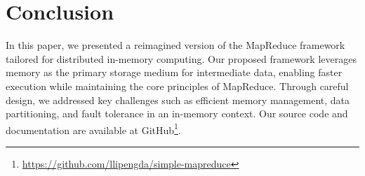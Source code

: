 \section{Conclusion}
\label{sec:conclusion}
In this paper, we presented a reimagined version of the MapReduce framework tailored for distributed in-memory computing. Our proposed framework leverages memory as the primary storage medium for intermediate data, enabling faster execution while maintaining the core principles of MapReduce. Through careful design, we addressed key challenges such as efficient memory management, data partitioning,
 and fault tolerance in an in-memory context. Our source code and documentation are available at GitHub\footnote{\url{https://github.com/llipengda/simple-mapreduce}}.